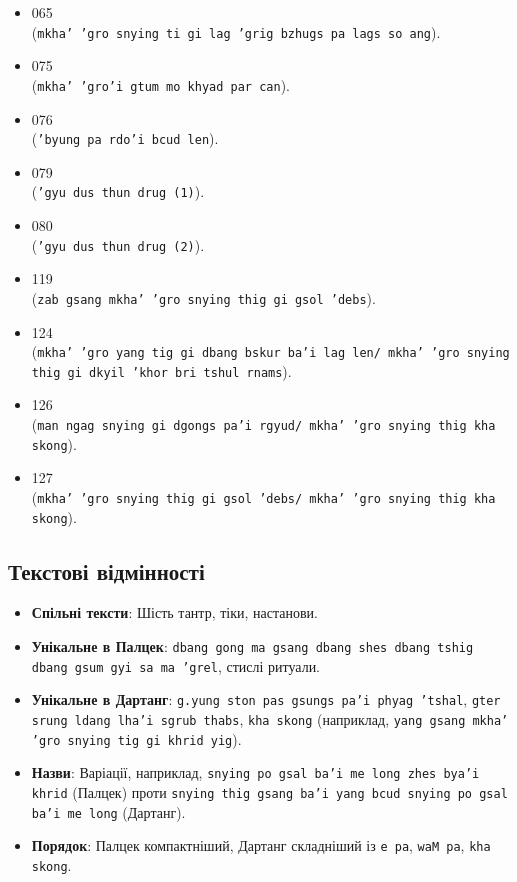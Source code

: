 \documentclass{article}
\begin{document}
\begingroup\raggedright
\begin{itemize}
\item 065  \\ (\texttt{mkha' 'gro snying ti gi lag 'grig bzhugs pa lags so ang}).
\item 075  \\ (\texttt{mkha' 'gro'i gtum mo khyad par can}).
\item 076  \\ (\texttt{'byung pa rdo'i bcud len}).
\item 079  \\ (\texttt{'gyu dus thun drug (1)}).
\item 080  \\ (\texttt{'gyu dus thun drug (2)}).
\item 119  \\ (\texttt{zab gsang mkha' 'gro snying thig gi gsol 'debs}).
\item 124  \\ (\texttt{mkha' 'gro yang tig gi dbang bskur ba'i lag len/ mkha' 'gro snying thig gi dkyil 'khor bri tshul rnams}).
\item 126  \\ (\texttt{man ngag snying gi dgongs pa'i rgyud/ mkha' 'gro snying thig kha skong}).
\item 127  \\ (\texttt{mkha' 'gro snying thig gi gsol 'debs/ mkha' 'gro snying thig kha skong}).
\end{itemize}
\endgroup

\newpage
\subsection{Текстові відмінності}

\begingroup\raggedright
\begin{itemize}
    \item \textbf{Спільні тексти}: Шість тантр, тіки, настанови.
    \item \textbf{Унікальне в Палцек}: \texttt{dbang gong ma gsang dbang shes dbang tshig dbang gsum gyi sa ma 'grel}, стислі ритуали.
    \item \textbf{Унікальне в Дартанг}: \texttt{g.yung ston pas gsungs pa'i phyag 'tshal}, \texttt{gter srung ldang lha'i sgrub thabs}, \texttt{kha skong} (наприклад, \texttt{yang gsang mkha' 'gro snying tig gi khrid yig}).
    \item \textbf{Назви}: Варіації, наприклад, \texttt{snying po gsal ba'i me long zhes bya'i khrid} (Палцек) проти \texttt{snying thig gsang ba'i yang bcud snying po gsal ba'i me long} (Дартанг).
    \item \textbf{Порядок}: Палцек компактніший, Дартанг складніший із \texttt{e pa}, \texttt{waM pa}, \texttt{kha skong}.
\end{itemize}
\endgroup
\end{document}

